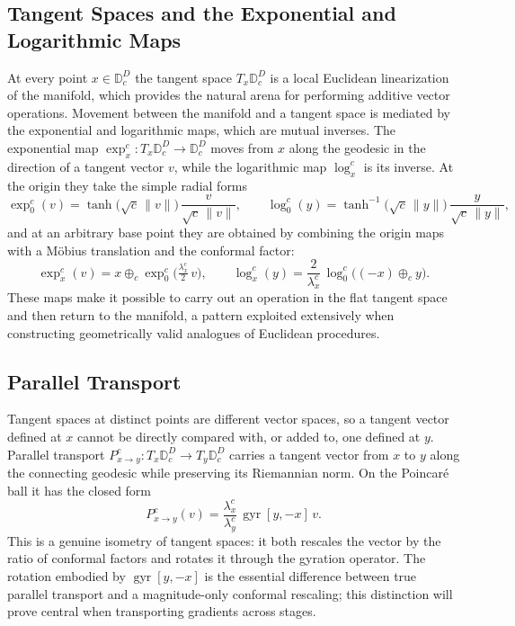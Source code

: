 \documentclass[12pt]{report}
\begin{document}
\subsection{Tangent Spaces and the Exponential and Logarithmic Maps}
At every point $x \in \mathbb{D}_c^D$ the tangent space $T_x\mathbb{D}_c^D$ is a local Euclidean linearization of the manifold, which provides the natural arena for performing additive vector operations. Movement between the manifold and a tangent space is mediated by the exponential and logarithmic maps, which are mutual inverses. The exponential map $\exp_x^c : T_x\mathbb{D}_c^D \to \mathbb{D}_c^D$ moves from $x$ along the geodesic in the direction of a tangent vector $v$, while the logarithmic map $\log_x^c$ is its inverse. At the origin they take the simple radial forms
\begin{equation}
    \label{eq:bg_expmap0}
    \exp_0^c(v) = \tanh\!\big(\sqrt{c}\,\|v\|\big)\,\frac{v}{\sqrt{c}\,\|v\|},
    \qquad
    \log_0^c(y) = \tanh^{-1}\!\big(\sqrt{c}\,\|y\|\big)\,\frac{y}{\sqrt{c}\,\|y\|},
\end{equation}
and at an arbitrary base point they are obtained by combining the origin maps with a M\"obius translation and the conformal factor:
\begin{equation}
    \label{eq:bg_expmap}
    \exp_x^c(v) = x \oplus_c \exp_0^c\!\Big(\tfrac{\lambda_x^c}{2}\, v\Big),
    \qquad
    \log_x^c(y) = \frac{2}{\lambda_x^c}\,\log_0^c\!\big((-x) \oplus_c y\big).
\end{equation}
These maps make it possible to carry out an operation in the flat tangent space and then return to the manifold, a pattern exploited extensively when constructing geometrically valid analogues of Euclidean procedures.

\subsection{Parallel Transport}
Tangent spaces at distinct points are different vector spaces, so a tangent vector defined at $x$ cannot be directly compared with, or added to, one defined at $y$. Parallel transport $P_{x \to y}^c : T_x\mathbb{D}_c^D \to T_y\mathbb{D}_c^D$ carries a tangent vector from $x$ to $y$ along the connecting geodesic while preserving its Riemannian norm. On the Poincar\'e ball it has the closed form
\begin{equation}
    \label{eq:bg_pt}
    P_{x \to y}^c(v) = \frac{\lambda_x^c}{\lambda_y^c}\,\operatorname{gyr}[y, -x]\,v.
\end{equation}
This is a genuine isometry of tangent spaces: it both rescales the vector by the ratio of conformal factors and rotates it through the gyration operator. The rotation embodied by $\operatorname{gyr}[y, -x]$ is the essential difference between true parallel transport and a magnitude-only conformal rescaling; this distinction will prove central when transporting gradients across stages.
\end{document}
